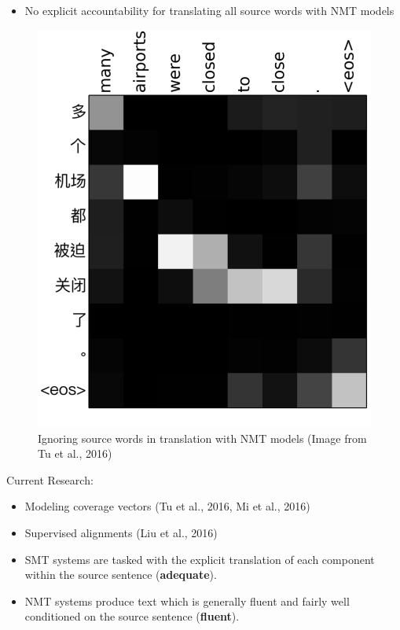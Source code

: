 \documentclass[landscape]{jhuslides3C}
\begin{document}
\begin{itemize}
\item No explicit accountability for translating all source words with NMT models
\end{itemize}
\begin{figure}
\begin{center}
\includegraphics[scale=0.2]{images/coverage.png}
\caption{Ignoring source words in translation with NMT models ({\tiny Image from Tu et al., 2016})}
\end{center}
\end{figure}
Current Research: 
\begin{itemize}
\item Modeling coverage vectors (Tu et al., 2016, Mi et al., 2016)
\item Supervised alignments (Liu et al., 2016)
\end{itemize}

\begin{itemize}
\item SMT systems are tasked with the explicit translation of each component within the source sentence (\textbf{adequate}).
\item NMT systems produce text which is generally fluent and fairly well conditioned on the source sentence (\textbf{fluent}).
\end{itemize}
\end{document}
